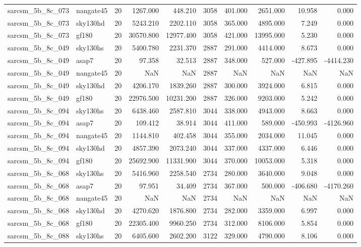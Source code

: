 \begin{tabular}{llrrrrrrrr}
sarcsm\_5b\_8c\_073 & nangate45 & 20 & 1267.000 & 448.210 & 3058 & 401.000 & 2651.000 & 10.958 & 0.000 \\
sarcsm\_5b\_8c\_073 & sky130hd & 20 & 5243.210 & 2202.110 & 3058 & 365.000 & 4895.000 & 7.249 & 0.000 \\
sarcsm\_5b\_8c\_073 & gf180 & 20 & 30570.800 & 12977.400 & 3058 & 421.000 & 13995.000 & 5.230 & 0.000 \\
sarcsm\_5b\_8c\_049 & sky130hs & 20 & 5400.780 & 2231.370 & 2887 & 291.000 & 4414.000 & 8.673 & 0.000 \\
sarcsm\_5b\_8c\_049 & asap7 & 20 & 97.358 & 32.513 & 2887 & 348.000 & 527.000 & -427.895 & -4414.230 \\
sarcsm\_5b\_8c\_049 & nangate45 & 20 & NaN & NaN & 2887 & NaN & NaN & NaN & NaN \\
sarcsm\_5b\_8c\_049 & sky130hd & 20 & 4206.170 & 1839.260 & 2887 & 300.000 & 3924.000 & 6.815 & 0.000 \\
sarcsm\_5b\_8c\_049 & gf180 & 20 & 22976.500 & 10231.200 & 2887 & 326.000 & 9203.000 & 5.242 & 0.000 \\
sarcsm\_5b\_8c\_094 & sky130hs & 20 & 6438.460 & 2587.810 & 3044 & 338.000 & 4943.000 & 8.663 & 0.000 \\
sarcsm\_5b\_8c\_094 & asap7 & 20 & 109.412 & 38.914 & 3044 & 411.000 & 589.000 & -450.993 & -4126.960 \\
sarcsm\_5b\_8c\_094 & nangate45 & 20 & 1144.810 & 402.458 & 3044 & 355.000 & 2034.000 & 11.045 & 0.000 \\
sarcsm\_5b\_8c\_094 & sky130hd & 20 & 4857.390 & 2073.240 & 3044 & 337.000 & 4337.000 & 6.446 & 0.000 \\
sarcsm\_5b\_8c\_094 & gf180 & 20 & 25692.900 & 11331.900 & 3044 & 370.000 & 10053.000 & 5.318 & 0.000 \\
sarcsm\_5b\_8c\_068 & sky130hs & 20 & 5416.960 & 2258.540 & 2734 & 280.000 & 3640.000 & 9.048 & 0.000 \\
sarcsm\_5b\_8c\_068 & asap7 & 20 & 97.951 & 34.409 & 2734 & 367.000 & 500.000 & -406.680 & -4170.260 \\
sarcsm\_5b\_8c\_068 & nangate45 & 20 & NaN & NaN & 2734 & NaN & NaN & NaN & NaN \\
sarcsm\_5b\_8c\_068 & sky130hd & 20 & 4270.620 & 1876.800 & 2734 & 282.000 & 3359.000 & 6.997 & 0.000 \\
sarcsm\_5b\_8c\_068 & gf180 & 20 & 22305.400 & 9960.250 & 2734 & 312.000 & 8106.000 & 5.854 & 0.000 \\
sarcsm\_5b\_8c\_088 & sky130hs & 20 & 6405.600 & 2602.200 & 3122 & 329.000 & 4790.000 & 8.106 & 0.000 \\

\end{tabular}
